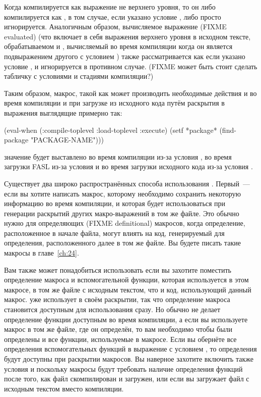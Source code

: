 Когда  компилируется как выражение не верхнего уровня, то он либо
компилируется как , в том случае, если указано условие , либо
просто игнорируется.  Аналогичным образом, вычисляемое выражение (FIXME evaluated)
 (что включает в себя выражения  верхнего уровня в
исходном тексте, обрабатываемом  и , вычисляемый во время
компиляции когда он является подвыражением другого  с условием
) также рассматривается как  если указано условие
, и игнорируется в противном случае. (FIXME может быть стоит сделать
табличку с условиями и стадиями компиляции?)

Таким образом, макрос, такой как  может производить необходимые действия
и во время компиляции и при загрузке из исходного кода путём раскрытия в выражения
 выглядящие примерно так:

\begin{myverb}
(eval-when (:compile-toplevel :load-toplevel :execute)
  (setf *package* (find-package "PACKAGE-NAME")))
\end{myverb}

\noindent{}значение  будет выставлено во время компиляции из-за условия
, во время загрузки FASL из-за условия  и во
время загрузки исходного кода из-за условия .

Существует два широко распространённых способа использования . Первый~---
если вы хотите написать макрос, которому необходимо сохранить некоторую информацию во
время компиляции, и которая будет использоваться при генерации раскрытий других
макро-выражений в том же файле.  Это обычно нужно для определяющих (FIXME definitional)
макросов, когда определение, расположенное в начале файла, могут влиять на код,
генерируемый для определения, расположенного далее в том же файле.  Вы будете писать такие
макросы в главе~\ref{ch:24}.

Вам также может понадобиться использовать  если вы захотите поместить
определение макроса и вспомогательной функции, которая используется в этом макросе, в том
же файле с исходным текстом, что и код, использующий данный макрос.  уже
использует  в своём раскрытии, так что определение макроса становится
доступным для использования сразу.  Но обычно  не делает определение функции
доступным во время компиляции, а если вы используете макрос в том же файле, где он
определён, то вам необходимо чтобы были определены и все функции, используемые в
макросе. Если вы обернёте все определения вспомогательных функций в выражение
 с условием , то определения будут доступны при
раскрытии макросов. Вы наверное захотите включить также условия  и
 поскольку макросы будут требовать наличие определения функций после того,
как файл скомпилирован и загружен, или если вы загружает файл с исходным текстом вместо
компиляции.

